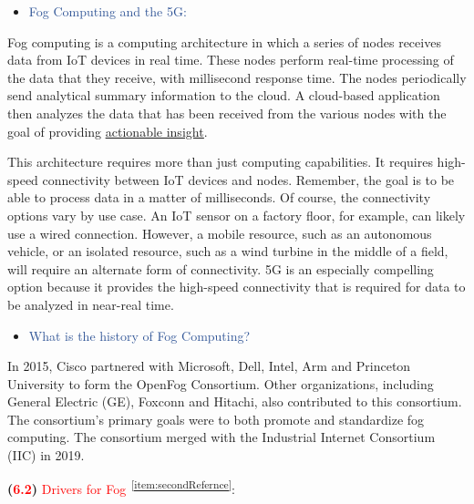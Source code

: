 \documentclass[11pt]{article}
\begin{document}
\newpage

\vspace{1\baselineskip}
\begin{itemize}
\item {\Large \textcolor[HTML]{2F5496}{Fog Computing and the 5G:}}
\end{itemize}

Fog computing is a computing architecture in which a series of nodes receives data from IoT devices in real time. These nodes perform real-time processing of the data that they receive, with millisecond response time. The nodes periodically send analytical summary information to the cloud. A cloud-based application then analyzes the data that has been received from the various nodes with the goal of providing \href{https://www.actian.com/blog/data-analytics/real-time-streaming-actionable-insights-drive-business-responsiveness/}{\uline{actionable insight}}.

This architecture requires more than just computing capabilities. It requires high-speed connectivity between IoT devices and nodes. Remember, the goal is to be able to process data in a matter of milliseconds. Of course, the connectivity options vary by use case. An IoT sensor on a factory floor, for example, can likely use a wired connection. However, a mobile resource, such as an autonomous vehicle, or an isolated resource, such as a wind turbine in the middle of a field, will require an alternate form of connectivity. 5G is an especially compelling option because it provides the high-speed connectivity that is required for data to be analyzed in near-real time.

\vspace{1\baselineskip}
\begin{itemize}
\item {\Large \textcolor[HTML]{2F5496}{What is the history of Fog Computing?}}
\end{itemize}

In 2015, Cisco partnered with Microsoft, Dell, Intel, Arm and Princeton University to form the OpenFog Consortium. Other organizations, including General Electric (GE), Foxconn and Hitachi, also contributed to this consortium. The consortium's primary goals were to both promote and standardize fog computing. The consortium merged with the Industrial Internet Consortium (IIC) in 2019.



\newpage

{\LARGE \textbf{(\textcolor[HTML]{FF0000}{6.2})} \textcolor[HTML]{FF0000}{Drivers for Fog}\textsuperscript{\textcolor[HTML]{0070C0}{~\ref{item:secondRefernce}}}\textcolor[HTML]{FF0000}{}:\newline}
\end{document}
